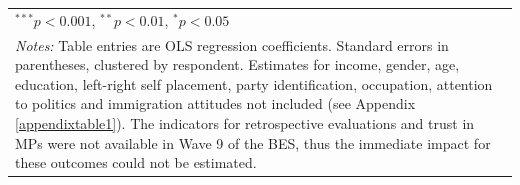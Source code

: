 \documentclass[12pt, letter]{article}
\begin{document}
\begin{table}[t]
\begin{center}
{\begin{tabular}{l c c c c c c}
\toprule[1.5pt]
\multicolumn{7}{l}{\scriptsize{$^{***}p<0.001$, $^{**}p<0.01$, $^*p<0.05$}} \\
\multicolumn{7}{l}{\multirow{3}{565pt}{\footnotesize{\textit{Notes:} Table entries are OLS regression coefficients. Standard errors in parentheses, clustered by respondent. Estimates for income, gender, age, education, left-right self placement, party identification, occupation, attention to politics and immigration attitudes not included (see Appendix \ref{appendixtable1}). The indicators for retrospective evaluations and trust in MPs were not available in Wave 9 of the BES, thus the immediate impact for these outcomes could not be estimated.}}} \\
\multicolumn{7}{l}{} \\
\end{tabular}}
\end{center}
\end{table}
\end{document}
